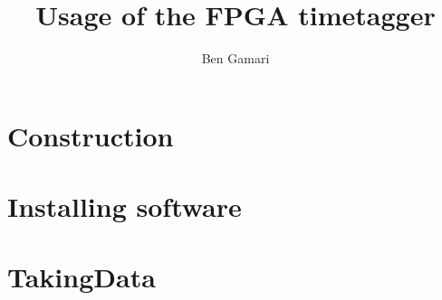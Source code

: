 \documentclass{report}
\begin{document}
\title{Usage of the FPGA timetagger}
\author{Ben Gamari}
\maketitle

\chapter{Construction}
\label{Ch:Construction}


\chapter{Installing software}
\label{Ch:Installing}


\chapter{TakingData}
\label{Ch:TakingData}

\end{document}
